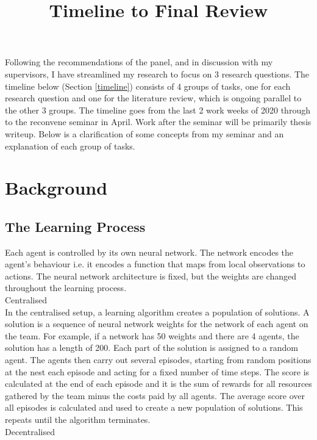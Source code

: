 \documentclass[12pt]{article}
\title{Timeline to Final Review}
\begin{document}
\maketitle

Following the recommendations of the panel, and in discussion with my supervisors, I have streamlined my research to focus on 3 research questions. The timeline below (Section \ref{timeline}) consists of 4 groups of tasks, one for each research question and one for the literature review, which is ongoing parallel to the other 3 groups. The timeline goes from the last 2 work weeks of 2020 through to the reconvene seminar in April. Work after the seminar will be primarily thesis writeup. Below is a clarification of some concepts from my seminar and an explanation of each group of tasks.

\section{Background}
\subsection{The Learning Process}

Each agent is controlled by its own neural network. The network encodes the agent’s behaviour i.e. it encodes a function that maps from local observations to actions. The neural network architecture is fixed, but the weights are changed throughout the learning process.\\

Centralised\\

In the centralised setup, a learning algorithm creates a population of solutions. A solution is a sequence of neural network weights for the network of each agent on the team. For example, if a network has 50 weights and there are 4 agents, the solution has a length of 200. Each part of the solution is assigned to a random agent. The agents then carry out several episodes, starting from random positions at the nest each episode and acting for a fixed number of time steps. The score is calculated at the end of each episode and it is the sum of rewards for all resources gathered by the team minus the costs paid by all agents. The average score over all episodes is calculated and used to create a new population of solutions. This repeats until the algorithm terminates.\\

Decentralised\\
\end{document}
